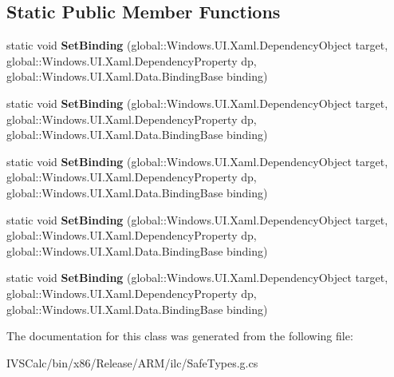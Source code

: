 \subsection*{Static Public Member Functions}
\begin{DoxyCompactItemize}
\item 
\mbox{\label{class_windows_1_1_u_i_1_1_xaml_1_1_data_1_1_binding_operations_ad49a2fd2e9bba7b9898fe0552967bfa3}} 
static void {\bfseries Set\+Binding} (global\+::\+Windows.\+U\+I.\+Xaml.\+Dependency\+Object target, global\+::\+Windows.\+U\+I.\+Xaml.\+Dependency\+Property dp, global\+::\+Windows.\+U\+I.\+Xaml.\+Data.\+Binding\+Base binding)
\item 
\mbox{\label{class_windows_1_1_u_i_1_1_xaml_1_1_data_1_1_binding_operations_ad49a2fd2e9bba7b9898fe0552967bfa3}} 
static void {\bfseries Set\+Binding} (global\+::\+Windows.\+U\+I.\+Xaml.\+Dependency\+Object target, global\+::\+Windows.\+U\+I.\+Xaml.\+Dependency\+Property dp, global\+::\+Windows.\+U\+I.\+Xaml.\+Data.\+Binding\+Base binding)
\item 
\mbox{\label{class_windows_1_1_u_i_1_1_xaml_1_1_data_1_1_binding_operations_ad49a2fd2e9bba7b9898fe0552967bfa3}} 
static void {\bfseries Set\+Binding} (global\+::\+Windows.\+U\+I.\+Xaml.\+Dependency\+Object target, global\+::\+Windows.\+U\+I.\+Xaml.\+Dependency\+Property dp, global\+::\+Windows.\+U\+I.\+Xaml.\+Data.\+Binding\+Base binding)
\item 
\mbox{\label{class_windows_1_1_u_i_1_1_xaml_1_1_data_1_1_binding_operations_ad49a2fd2e9bba7b9898fe0552967bfa3}} 
static void {\bfseries Set\+Binding} (global\+::\+Windows.\+U\+I.\+Xaml.\+Dependency\+Object target, global\+::\+Windows.\+U\+I.\+Xaml.\+Dependency\+Property dp, global\+::\+Windows.\+U\+I.\+Xaml.\+Data.\+Binding\+Base binding)
\item 
\mbox{\label{class_windows_1_1_u_i_1_1_xaml_1_1_data_1_1_binding_operations_ad49a2fd2e9bba7b9898fe0552967bfa3}} 
static void {\bfseries Set\+Binding} (global\+::\+Windows.\+U\+I.\+Xaml.\+Dependency\+Object target, global\+::\+Windows.\+U\+I.\+Xaml.\+Dependency\+Property dp, global\+::\+Windows.\+U\+I.\+Xaml.\+Data.\+Binding\+Base binding)
\end{DoxyCompactItemize}


The documentation for this class was generated from the following file\+:\begin{DoxyCompactItemize}
\item 
I\+V\+S\+Calc/bin/x86/\+Release/\+A\+R\+M/ilc/Safe\+Types.\+g.\+cs\end{DoxyCompactItemize}
